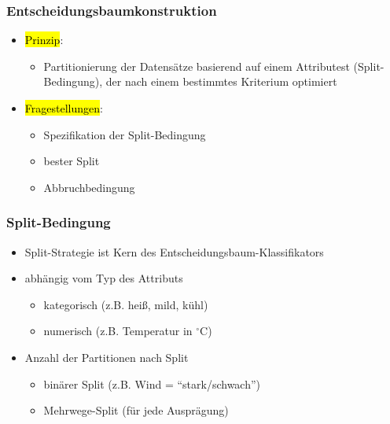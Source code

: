 \begin{frame}
\frametitle{Entscheidungsbaumkonstruktion}

\begin{itemize}
\item \hl{Prinzip}: 
\begin{itemize}
\item Partitionierung der Datensätze basierend auf einem Attributest
  (Split-Bedingung), der nach einem bestimmtes Kriterium optimiert
\end{itemize}

\item \hl{Fragestellungen}:
\begin{itemize}
\item Spezifikation der Split-Bedingung
\item bester Split
\item Abbruchbedingung
\end{itemize}
\end{itemize}
\end{frame}

\begin{frame}
\frametitle{Split-Bedingung}

\begin{itemize}
\item Split-Strategie ist Kern des Entscheidungsbaum-Klassifikators
\item abhängig vom Typ des Attributs
\begin{itemize}
\item kategorisch (z.B. heiß, mild, kühl)
\item numerisch (z.B. Temperatur in $^\circ$C)
\end{itemize}
\item Anzahl der Partitionen nach Split
\begin{itemize}
\item binärer Split (z.B. Wind = "`stark/schwach"')
\item Mehrwege-Split (für jede Ausprägung)
\end{itemize}
\end{itemize}

\end{frame}

